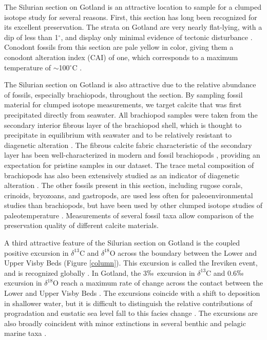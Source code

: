\documentclass[5p, authoryear]{elsarticle}
\newcommand{\deltao}{$\delta^{18}$}
\newcommand{\deltac}{$\delta^{13}$}
\newcommand{\degrees}{$^{\circ}$}
\begin{document}
The Silurian section on Gotland is an attractive location to sample for a clumped isotope study for several reasons. First, this section has long been recognized for its excellent preservation. The strata on Gotland are very nearly flat-lying, with a dip of less than 1\degrees, and display only minimal evidence of tectonic disturbance \citep{Calner2004a,Jeppsson1983}. Conodont fossils from this section are pale yellow in color, giving them a conodont alteration index (CAI) of one, which corresponds to a maximum temperature of $\sim$100\degrees C \citep{Epstein1976,Jeppsson1983,Wenzel2000}. 

The Silurian section on Gotland is also attractive due to the relative abundance of fossils, especially brachiopods, throughout the section. By sampling fossil material for clumped isotope measurements, we target calcite that was first precipitated directly from seawater. All brachiopod samples were taken from the secondary interior fibrous layer of the brachiopod shell, which is thought to precipitate in equilibrium with seawater and to be relatively resistant to diagenetic alteration \citep{Azmy1998,Samtleben2001}. The fibrous calcite fabric characteristic of the secondary layer has been well-characterized in modern and fossil brachiopods \citep{PerezHuerta2007,Samtleben2001,Schmahl2004}, providing an expectation for pristine samples in our dataset. The trace metal composition of brachiopods has also been extensively studied as an indicator of diagenetic alteration \citep{Azmy1998,Brand2003,Brand2012,Mii1994,Grossman1996,Shields2003}. The other fossils present in this section, including rugose corals, crinoids, bryozoans, and gastropods, are used less often for paleoenvironmental studies than brachiopods, but have been used by other clumped isotope studies of paleotemperature \citep{Came2007,Dennis2013,Finnegan2011}. Measurements of several fossil taxa allow comparison of the preservation quality of different calcite materials. 

A third attractive feature of the Silurian section on Gotland is the coupled positive excursion in \deltac C and \deltao O across the boundary between the Lower and Upper Visby Beds (Figure \ref{column}). This excursion is called the Ireviken event, and is recognized globally \citep{Munnecke2003}. In Gotland, the 3$\permil$ excursion in \deltac C and 0.6$\permil$ excursion in \deltao O reach a maximum rate of change across the contact between the Lower and Upper Visby Beds \citep{Munnecke2003}. The excursions coincide with a shift to deposition in shallower water, but it is difficult to distinguish the relative contributions of progradation and eustatic sea level fall to this facies change \citep{Calner2004a}. The excursions are also broadly coincident with minor extinctions in several benthic and pelagic marine taxa \citep{Munnecke2003}. 
\end{document}
